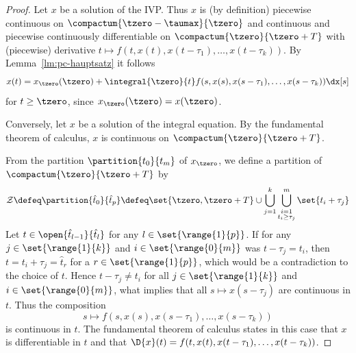     \begin{proof}
        Let $x$ be a solution of the IVP. Thus $x$ is (by definition) piecewise continuous on $\compactum{\tzero-\taumax}{\tzero}$ and continuous and piecewise continuously differentiable on $\compactum{\tzero}{\tzero+T}$ with (piecewise) derivative $t\mapsto f(t,x(t),x(t-\tau_1),\ldots,x(t-\tau_k))$.
        By Lemma~\ref{lm:pc-hauptsatz} it follows
        \begin{equation*}
            x(t) = x_{\tzero}(\tzero) + \integral{\tzero}{t} f(s,x(s),x(s-\tau_1),\ldots,x(s-\tau_k))\dx[s]
        \end{equation*}
        for $t\geq\tzero$, since $x_{\tzero}(\tzero)=x(\tzero)$.

        Conversely, let $x$ be a solution of the integral equation.
        By the fundamental theorem of calculus, $x$ is continuous on $\compactum{\tzero}{\tzero+T}$.

        From the partition $\partition{t_0}{t_m}$ of $x_{\tzero}$, we define a partition of $\compactum{\tzero}{\tzero+T}$ by
        \begin{equation*}
            \mathcal{Z}\defeq \partition{\hat{t}_0}{\hat{t}_p}
            \defeq \set{\tzero,\tzero+T}\cup\bigcup_{j=1}^{k}\bigcup_{\substack{i=1\\t_i\geq\tau_j}}^{m}\set{t_i+\tau_j}
        \end{equation*}
        Let $t\in\open{\hat{t}_{l-1}}{\hat{t}_l}$ for any $l\in\set{\range{1}{p}}$. If for any $j\in\set{\range{1}{k}}$ and $i\in\set{\range{0}{m}}$ was $t-\tau_j = t_i$, then $t=t_i+\tau_j=\hat{t}_r$ for a $r\in\set{\range{1}{p}}$, which would be a contradiction to the choice of $t$. Hence $t-\tau_j \neq t_i$ for all $j\in\set{\range{1}{k}}$ and $i\in\set{\range{0}{m}}$, what implies that all $s\mapsto x(s-\tau_j)$ are continuous in $t$. Thus the composition
        \begin{equation*}
            s\mapsto f(s,x(s),x(s-\tau_1),\ldots,x(s-\tau_k))
        \end{equation*}
        is continuous in $t$. The fundamental theorem of calculus states in this case that $x$ is differentiable in $t$ and that $\D{x}(t)=f(t,x(t),x(t-\tau_1),\ldots,x(t-\tau_k))$.


\end{proof}
